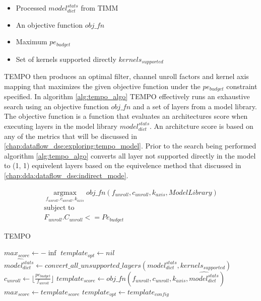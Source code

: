\begin{itemize}
\item Processed $model^{stats}_{dict}$ from TIMM
\item An objective function $obj\_fn$
\item Maximum $pe_{budget}$ 
\item Set of kernels supported directly  $kernels_{supported}$ 
\end{itemize}

TEMPO then produces an optimal filter, channel unroll factors and kernel axis
mapping that maximizes the given objective function under the $pe_{budget}$
constraint specified. 
In algorithm \ref{alg:tempo_algo} TEMPO effectively runs an exhaustive search
using an objective function $obj\_fn$ and a set of layers from a model library.
The objective function is a function that evaluates an architectures score when
executing layers in the model library $model^{stats}_{dict}$. An architcture
score is based on any of the metrics that will be discussed in
\autoref{chap:dataflow_dse:exploring:tempo_model}. Prior to the search being
performed algorithm \ref{alg:tempo_algo} converts all layer not supported
directly in the model to (1, 1) equivelent layers based on the equivelence method
that discussed in \autoref{chap:dda:dataflow_dse:indirect_mode}.

\begin{equation}
    \begin{aligned}
        \operatorname*{argmax}_{f_{unroll}, c_{unroll}, k_{axis}} obj\_fn(f_{unroll}, c_{unroll}, k_{axis}, ModelLibrary) \\
        \text{subject to} \\
        F_{unroll}. C_{unroll} <= Pe_{budget}
    \end{aligned}
    \label{math:tempo_algo_tldr}
\end{equation}

\begin{algorithm}[H] 
    \caption{\ac{TEMPO}}
    \label{alg:tempo_algo}
    \begin{algorithmic}[1]
    \Statex
        \State $max_{score} \gets -\inf$
        \State $template_{opt} \gets nil$
        \State $\hat{model^{stats}_{dict}} \gets convert\_all\_unsupported\_layers(model^{stats}_{dict}, kernels_{supported})$
                \State $c_{unroll} \gets \lfloor \frac{pe_{budget}}{f_{unroll}} \rfloor$ 
                \State $template_{score} \gets obj\_fn(f_{unroll}, c_{unroll}, k_{axis}, \hat{model^{stats}_{dict}})$
                    \State $max_{score} \gets template_{score}$
                    \State $template_{opt} \gets template_{config}$
                \EndIf
            \EndFor
        \EndFor
        \State {}
    \EndFunction
    \end{algorithmic}
\end{algorithm}

